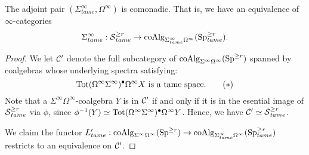 \begin{theorem}
	The adjoint pair $(\Sigma^{\infty}_{tame},\Omega^{\infty})$ is comonadic. That is, we have an equivalence of $\infty$-categories
	\[
	\Sigma^{\infty}_{tame}: \operatorname{\mathcal{S}}^{\geq r}_{tame} \to \operatorname{coAlg}_{\Sigma^{\infty}_{tame}\Omega^{\infty}}(\operatorname{Sp}^{\geq r}_{tame}).
	\]
\end{theorem}
\begin{proof}





We let ${\mathcal{C}}'$ denote the full subcategory of $\operatorname{coAlg}_{\Sigma^{\infty}\Omega^{\infty}}(\operatorname{Sp}^{\geq r})$ spanned by coalgebras whose underlying spectra satisfying:
\[
\operatorname{\operatorname{Tot}} (\Omega^\infty \Sigma^{\infty})^{\bullet} \Omega^{\infty}X 
\text{ is a tame space.}
\tag{$\ast$}
\]
Note that a $\Sigma^{\infty}\Omega^{\infty}$-coalgebra $Y$ is in ${\mathcal{C}}'$ if and only if it is in the esential image of $\operatorname{\mathcal{S}}^{\geq r}_{tame}$ via $\phi$, since $\phi^{-1}(Y)\simeq \operatorname{\operatorname{Tot}} (\Omega^\infty \Sigma^{\infty})^{\bullet} \Omega^{\infty}Y $.
Hence, we have ${\mathcal{C}}'\simeq \operatorname{\mathcal{S}}^{\geq r}_{tame}$.

We claim the functor $L'_{tame}: \operatorname{coAlg}_{\Sigma^{\infty}\Omega^{\infty}}(\operatorname{Sp}^{\geq r}) \to \operatorname{coAlg}_{\Sigma^{\infty}_{tame}\Omega^{\infty}}(\operatorname{Sp}_{tame}^{\geq r})$ restricts to an equivalence on ${\mathcal{C}}'$.





\end{proof}
